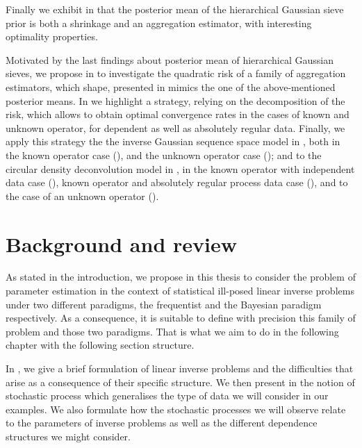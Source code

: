 \documentclass[a4paper,11pt]{book}
\begin{document}
Finally we exhibit in  that the posterior mean of the hierarchical Gaussian sieve prior is both a shrinkage and an aggregation estimator, with interesting optimality properties.

\medskip

Motivated by the last findings about posterior mean of hierarchical Gaussian sieves, we propose in  to investigate the quadratic risk of a family of aggregation estimators, which shape, presented in  mimics the one of the above-mentioned posterior means.
In  we highlight a strategy, relying on the decomposition of the risk, which allows to obtain optimal convergence rates in the cases of known and unknown operator, for dependent as well as absolutely regular data.
Finally, we apply this strategy the the inverse Gaussian sequence space model in , both in the known operator case (), and the unknown operator case (); and to the circular density deconvolution model in , in the known operator with independent data case (), known operator and absolutely regular process data case (), and to the case of an unknown operator ().

\chapter{Background and review}\label{BACKGROUND}
As stated in the introduction, we propose in this thesis to consider the problem of parameter estimation in the context of statistical ill-posed linear inverse problems under two different paradigms, the frequentist and the Bayesian paradigm respectively.
As a consequence, it is suitable to define with precision this family of problem and those two paradigms.
That is what we aim to do in the following chapter with the following section structure.

\medskip

In , we give a brief formulation of linear inverse problems and the difficulties that arise as a consequence of their specific structure.
We then present in  the notion of stochastic process which generalises the type of data we will consider in our examples. We also formulate how the stochastic processes we will observe relate to the parameters of inverse problems as well as the different dependence structures we might consider.
\end{document}
